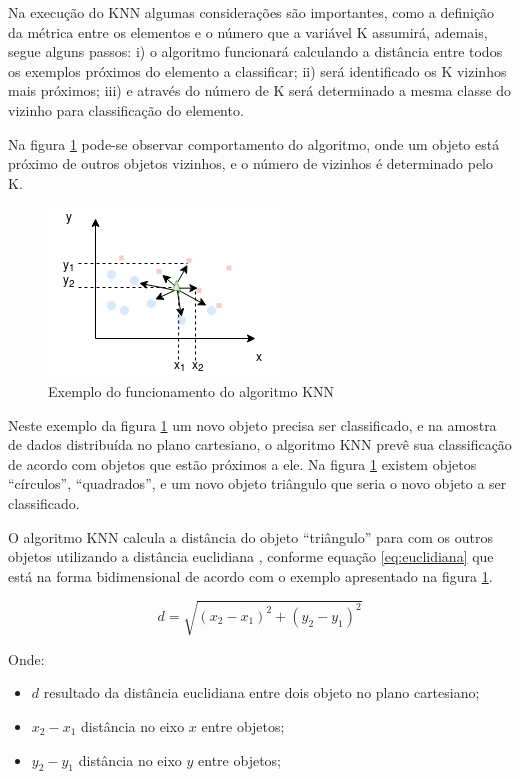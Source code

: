 Na execução do KNN algumas considerações são importantes, como a definição da métrica entre os elementos e o número que a variável K assumirá, ademais, segue alguns passos: i) o algoritmo funcionará calculando a distância entre todos os exemplos próximos do elemento a classificar; ii) será identificado os K vizinhos mais próximos; iii) e através do número de K será determinado a mesma classe do vizinho para classificação do elemento. 

Na figura \ref{fig:knn} pode-se observar comportamento do algoritmo, onde um objeto está próximo de outros objetos vizinhos, e o número de vizinhos é determinado pelo K.

\begin{figure}[h!]
    \centering
    \includegraphics[scale=0.9]{figs/ex_knn1.png}
    
    
    \caption{Exemplo do funcionamento do algoritmo KNN} 
    \label{fig:knn}     
\end{figure}

Neste exemplo da figura \ref{fig:knn} um novo objeto precisa ser classificado, e na amostra de dados distribuída no plano cartesiano, o algoritmo KNN prevê sua classificação de acordo com objetos que estão próximos a ele. Na figura \ref{fig:knn} existem objetos ``círculos'', ``quadrados'', e um novo objeto triângulo que seria o novo objeto a ser classificado. 

O algoritmo KNN calcula a distância do objeto ``triângulo'' para com os outros objetos utilizando a distância euclidiana \cite{Lachi2005}, conforme equação \ref{eq:euclidiana} que está na forma bidimensional de acordo com o exemplo apresentado na figura \ref{fig:knn}.

\begin{equation}
d=\sqrt{(x_2-x_1)^2 + (y_2-y_1)^2}
 \label{eq:euclidiana}
\end{equation}

Onde:
\begin{itemize}[noitemsep]
 \item ${d}$ resultado da distância euclidiana entre dois objeto no plano cartesiano;
 \item ${x_2-x_1}$ distância no eixo ${x}$ entre objetos;%
 \item ${y_2-y_1}$ distância no eixo ${y}$ entre  objetos;%
\end{itemize}

